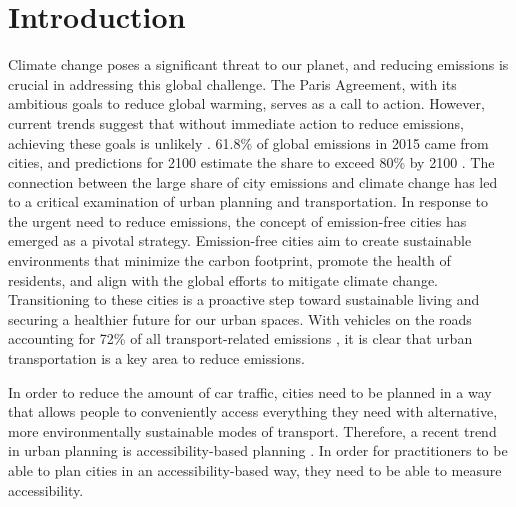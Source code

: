 \clearpage
\section{Introduction}
\label{sec:introduction}




Climate change poses a significant threat to our planet, and reducing emissions is crucial in addressing this global challenge.
The Paris Agreement, with its ambitious goals to reduce global warming, serves as a call to action.
However, current trends suggest that without immediate action to reduce emissions, achieving these goals is unlikely .
61.8\% of global emissions in 2015 came from cities, and predictions for 2100 estimate the share to exceed 80\% by 2100 .
The connection between the large share of city emissions and climate change has led to a critical examination of urban planning and transportation.
In response to the urgent need to reduce emissions, the concept of emission-free cities has emerged as a pivotal strategy.
Emission-free cities aim to create sustainable environments that minimize the carbon footprint, promote the health of residents, and align with the global efforts to mitigate climate change.
Transitioning to these cities is a proactive step toward sustainable living and securing a healthier future for our urban spaces.
With vehicles on the roads accounting for 72\% of all transport-related emissions , it is clear that urban transportation is a key area to reduce emissions.


In order to reduce the amount of car traffic, cities need to be planned in a way that allows people to conveniently access everything they need with alternative, more environmentally sustainable modes of transport.
Therefore, a recent trend in urban planning is accessibility-based planning .
In order for practitioners to be able to plan cities in an accessibility-based way, they need to be able to measure accessibility.

